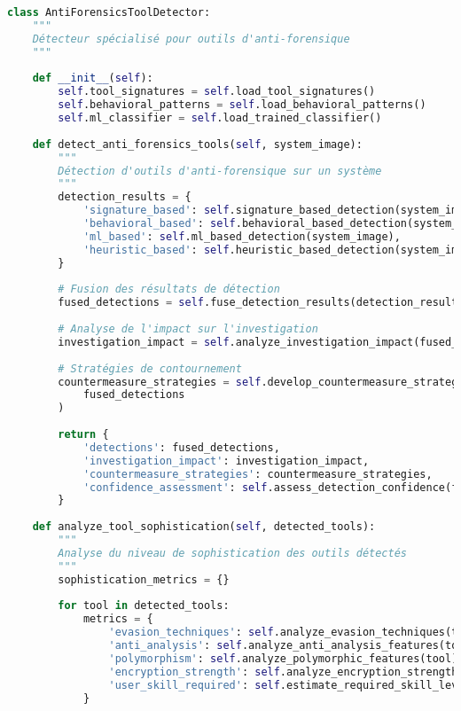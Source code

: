 \begin{lstlisting}[language=Python, caption=Détecteur d'outils anti-forensique]
class AntiForensicsToolDetector:
    """
    Détecteur spécialisé pour outils d'anti-forensique
    """
    
    def __init__(self):
        self.tool_signatures = self.load_tool_signatures()
        self.behavioral_patterns = self.load_behavioral_patterns()
        self.ml_classifier = self.load_trained_classifier()
        
    def detect_anti_forensics_tools(self, system_image):
        """
        Détection d'outils d'anti-forensique sur un système
        """
        detection_results = {
            'signature_based': self.signature_based_detection(system_image),
            'behavioral_based': self.behavioral_based_detection(system_image),
            'ml_based': self.ml_based_detection(system_image),
            'heuristic_based': self.heuristic_based_detection(system_image)
        }
        
        # Fusion des résultats de détection
        fused_detections = self.fuse_detection_results(detection_results)
        
        # Analyse de l'impact sur l'investigation
        investigation_impact = self.analyze_investigation_impact(fused_detections)
        
        # Stratégies de contournement
        countermeasure_strategies = self.develop_countermeasure_strategies(
            fused_detections
        )
        
        return {
            'detections': fused_detections,
            'investigation_impact': investigation_impact,
            'countermeasure_strategies': countermeasure_strategies,
            'confidence_assessment': self.assess_detection_confidence(fused_detections)
        }
    
    def analyze_tool_sophistication(self, detected_tools):
        """
        Analyse du niveau de sophistication des outils détectés
        """
        sophistication_metrics = {}
        
        for tool in detected_tools:
            metrics = {
                'evasion_techniques': self.analyze_evasion_techniques(tool),
                'anti_analysis': self.analyze_anti_analysis_features(tool),
                'polymorphism': self.analyze_polymorphic_features(tool),
                'encryption_strength': self.analyze_encryption_strength(tool),
                'user_skill_required': self.estimate_required_skill_level(tool)
            }
            

\end{lstlisting}
